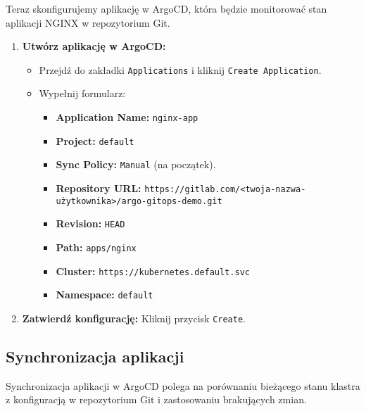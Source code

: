 \documentclass{article}
\begin{document}
Teraz skonfigurujemy aplikację w ArgoCD, która będzie monitorować stan aplikacji NGINX w repozytorium Git.

\begin{enumerate}
    \item \textbf{Utwórz aplikację w ArgoCD:}
    \begin{itemize}
        \item Przejdź do zakładki \texttt{Applications} i kliknij \texttt{Create Application}.
        \item Wypełnij formularz:
            \begin{itemize}
                \item \textbf{Application Name:} \texttt{nginx-app}
                \item \textbf{Project:} \texttt{default}
                \item \textbf{Sync Policy:} \texttt{Manual} (na początek).
                \item \textbf{Repository URL:} \texttt{https://gitlab.com/<twoja-nazwa-użytkownika>/argo-gitops-demo.git}
                \item \textbf{Revision:} \texttt{HEAD}
                \item \textbf{Path:} \texttt{apps/nginx}
                \item \textbf{Cluster:} \texttt{https://kubernetes.default.svc}
                \item \textbf{Namespace:} \texttt{default}
            \end{itemize}
    \end{itemize}
    
    \item \textbf{Zatwierdź konfigurację:} Kliknij przycisk \texttt{Create}.
\end{enumerate}

\subsection{Synchronizacja aplikacji}

Synchronizacja aplikacji w ArgoCD polega na porównaniu bieżącego stanu klastra z konfiguracją w repozytorium Git i zastosowaniu brakujących zmian.
\end{document}

